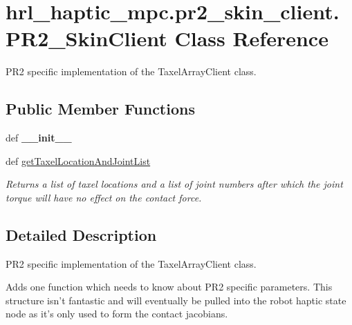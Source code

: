 \hypertarget{classhrl__haptic__mpc_1_1pr2__skin__client_1_1_p_r2___skin_client}{\section{hrl\-\_\-haptic\-\_\-mpc.\-pr2\-\_\-skin\-\_\-client.\-P\-R2\-\_\-\-Skin\-Client \-Class \-Reference}
\label{classhrl__haptic__mpc_1_1pr2__skin__client_1_1_p_r2___skin_client}
}


\-P\-R2 specific implementation of the \-Taxel\-Array\-Client class.  


\subsection*{\-Public \-Member \-Functions}
\begin{DoxyCompactItemize}
\item 
\hypertarget{classhrl__haptic__mpc_1_1pr2__skin__client_1_1_p_r2___skin_client_acaa313e1a9b3f4ab4065927fdb00eb27}{def {\bfseries \-\_\-\-\_\-init\-\_\-\-\_\-}}\label{classhrl__haptic__mpc_1_1pr2__skin__client_1_1_p_r2___skin_client_acaa313e1a9b3f4ab4065927fdb00eb27}

\item 
def \hyperlink{classhrl__haptic__mpc_1_1pr2__skin__client_1_1_p_r2___skin_client_a60ad343e9b6033aaf3419ab66bd436c6}{get\-Taxel\-Location\-And\-Joint\-List}
\begin{DoxyCompactList}\small\item\em \-Returns a list of taxel locations and a list of joint numbers after which the joint torque will have no effect on the contact force. \end{DoxyCompactList}\end{DoxyCompactItemize}


\subsection{\-Detailed \-Description}
\-P\-R2 specific implementation of the \-Taxel\-Array\-Client class. 

\-Adds one function which needs to know about \-P\-R2 specific parameters. \-This structure isn't fantastic and will eventually be pulled into the robot haptic state node as it's only used to form the contact jacobians. 

